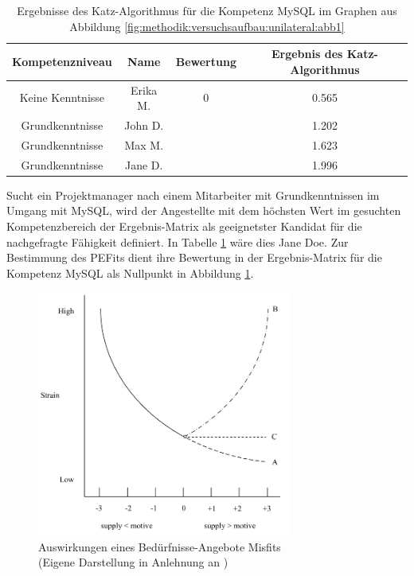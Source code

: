 \begin{table}[h]
	\centering
	\begin{tabular}{c|c|c|c}
		Kompetenzniveau & Name & Bewertung & Ergebnis des Katz-Algorithmus \\
		\hline
		\rowcolor{usercolor} Keine Kenntnisse & Erika M.  & 0                  & 0.565\\
		\hline
		\rowcolor{itemcolor} Grundkenntnisse  & John D.   & \kantengewicht     & 1.202\\
		\rowcolor{itemcolor} Grundkenntnisse  & Max M.    & \kantengewicht     & 1.623\\
		\rowcolor{itemcolor} Grundkenntnisse  & Jane D.   & \kantengewicht     & 1.996
	\end{tabular}
	\caption{Ergebnisse des Katz-Algorithmus für die Kompetenz MySQL im Graphen aus Abbildung \ref{fig:methodik:versuchsaufbau:unilateral:abb1}}
	\label{tbl:methodik:versuchsaufbau:unilateral:tbl1}
\end{table}

Sucht ein Projektmanager nach einem Mitarbeiter mit Grundkenntnissen im Umgang mit MySQL, wird der Angestellte mit dem höchsten Wert im gesuchten Kompetenzbereich der Ergebnis-Matrix als geeignetster Kandidat für die nachgefragte Fähigkeit definiert. In Tabelle \ref{tbl:methodik:versuchsaufbau:unilateral:tbl1} wäre dies Jane Doe. Zur Bestimmung des \acp{PEFit} dient ihre Bewertung in der Ergebnis-Matrix für die Kompetenz MySQL als Nullpunkt in Abbildung \ref{fig:methodik:versuchsaufbau:unilateral:abb2}.

\begin{figure}[h]
	\centering
	\includegraphics[width=0.75\textwidth]{gfx/ueberschuss_supply_motive.png}
	\caption{Auswirkungen eines Bedürfnisse-Angebote Misfits\\(Eigene Darstellung in Anlehnung an \cite[S. 23]{edwards:2008})}
	\label{fig:methodik:versuchsaufbau:unilateral:abb2}
\end{figure}

